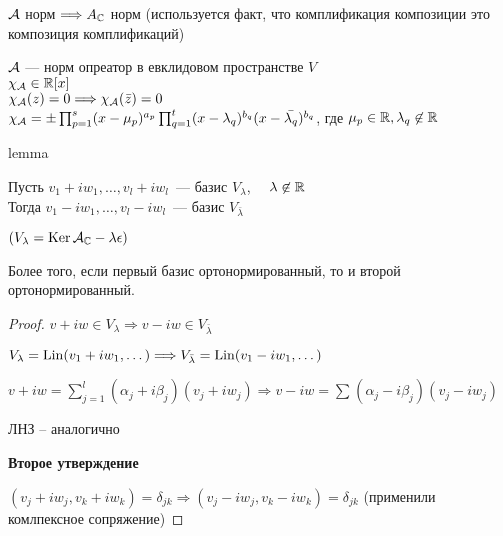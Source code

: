 \follow $\mathcal{A} $ норм $ \Longrightarrow A_{\mathbb{C}} $ норм (используется факт, что комплификация композиции это композиция комплификаций)


\begin{theorem}
    $ \mathcal{A} $ --- норм опреатор в евклидовом пространстве $ V $ \\
    $ \chi_{\mathcal{A}} \in \mathbb{R}[x] $ \\
    $ \chi_{\mathcal{A}}(z) = 0 \Longrightarrow \chi_{\mathcal{A}}(\bar{z}) = 0 $ \\
    $ \chi_{\mathcal{A}} = \pm \prod_{p = 1}^{s} (x - \mu_p)^{a_p} \prod_{q = 1}^{t} (x - \lambda_q)^{b_q} (x - \bar{\lambda_q})^{b_q}$, где $\mu_p \in \mathbb{R} , \lambda_q \not \in \mathbb{R}$ \\
\end{theorem}

lemma

Пусть $v_1 + iw_1, \dots, v_l + iw_l$~--- базис $V_{\lambda}$, $\quad \lambda \not \in \mathbb{R}$ \\
Тогда $v_1 - iw_1, \dots, v_l - iw_l$~--- базис $V_{\bar{\lambda}}$

$ (V_{\lambda} = \operatorname{Ker}{\mathcal{A}_{\mathbb{C}} - \lambda \epsilon}) $ %

Более того, если первый базис ортонормированный, то и второй ортонормированный.

\begin{proof}
\emptyln
$v + iw \in V_{\lambda} \Longrightarrow v - iw \in V_{\bar{\lambda}}$ %

$ V_{\lambda} = \operatorname{Lin}(v_1 + iw_1, \dots ) \Longrightarrow V_{\bar{\lambda}} = \operatorname{Lin}(v_1 - iw_1, \dots) $

$ v + iw = \sum_{j = 1}^{l} (\alpha_j + i \beta_j) (v_j + i w_j) \Longrightarrow v - iw = \sum_{}^{} (\alpha_j - i \beta_j) (v_j - i w_j) $

ЛНЗ -- аналогично


\textbf{Второе утверждение} 

$ (v_j + i w_j, v_k + iw_k) = \delta_{jk} \Longrightarrow  (v_j - i w_j, v_k - iw_k) = \delta_{jk}$ (применили комлпексное сопряжение)
\end{proof}

